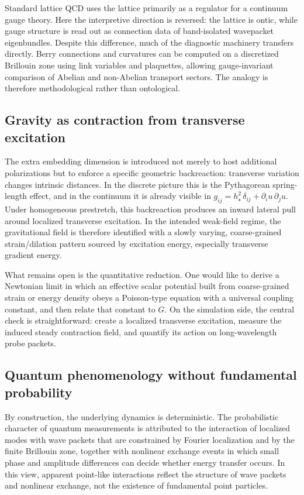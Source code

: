 Standard lattice QCD uses the lattice primarily as a regulator for a continuum gauge theory.
Here the interpretive direction is reversed: the lattice is ontic, while gauge structure is read out as connection data
of band-isolated wavepacket eigenbundles.
Despite this difference, much of the diagnostic machinery transfers directly.
Berry connections and curvatures can be computed on a discretized Brillouin zone using link variables and plaquettes,
allowing gauge-invariant comparison of Abelian and non-Abelian transport sectors.
The analogy is therefore methodological rather than ontological.

\subsection{Gravity as contraction from transverse excitation}

The extra embedding dimension is introduced not merely to host additional polarizations but to enforce a specific
geometric backreaction: transverse variation changes intrinsic distances.
In the discrete picture this is the Pythagorean spring-length effect, and in the continuum it is already visible in
$g_{ij}=h_\star^2\,\delta_{ij}+\partial_i u\,\partial_j u$.
Under homogeneous prestretch, this backreaction produces an inward lateral pull around localized transverse excitation.
In the intended weak-field regime, the gravitational field is therefore identified with a slowly varying,
coarse-grained strain/dilation pattern sourced by excitation energy, especially transverse gradient energy.

What remains open is the quantitative reduction.
One would like to derive a Newtonian limit in which an effective scalar potential built from coarse-grained strain or
energy density obeys a Poisson-type equation with a universal coupling constant, and then relate that constant to $G$.
On the simulation side, the central check is straightforward: create a localized transverse excitation, measure the
induced steady contraction field, and quantify its action on long-wavelength probe packets.

\subsection{Quantum phenomenology without fundamental probability}

By construction, the underlying dynamics is deterministic.
The probabilistic character of quantum measurements is attributed to the interaction of localized modes with wave packets
that are constrained by Fourier localization and by the finite Brillouin zone, together with nonlinear exchange events
in which small phase and amplitude differences can decide whether energy transfer occurs.
In this view, apparent point-like interactions reflect the structure of wave packets and nonlinear exchange,
not the existence of fundamental point particles.

